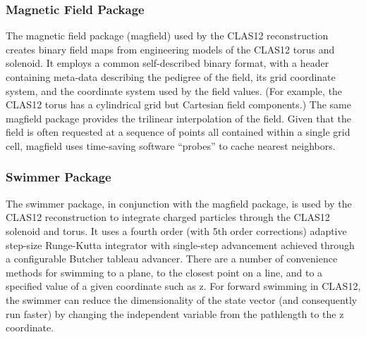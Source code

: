 \subsubsection{Magnetic Field Package}
The magnetic field package (magfield) used by the CLAS12 reconstruction creates
binary field maps from engineering models of the CLAS12 torus and solenoid. It employs
a common self-described binary format, with a header containing meta-data describing
the pedigree of the field, its grid coordinate system, and the coordinate system
used by the field values. (For example, the CLAS12 torus has a cylindrical grid
but Cartesian field components.) The same magfield package provides the trilinear
interpolation of the field. Given that the field is often requested at a sequence
of points all contained within a single grid cell, magfield uses time-saving
software “probes” to cache nearest neighbors.

\subsubsection{Swimmer Package}
The swimmer package, in conjunction with the magfield package, is used by the CLAS12
reconstruction to integrate charged particles through the CLAS12 solenoid and torus.
It uses a fourth order (with 5th order corrections) adaptive step-size Runge-Kutta integrator
with single-step advancement achieved through a configurable Butcher tableau advancer.
There are a number of convenience methods for swimming to a plane, to the closest
point on a line, and to a specified value of a given coordinate such as z. For
forward swimming in CLAS12, the swimmer can reduce the dimensionality of the state
vector (and consequently run faster) by changing the independent variable from
the pathlength to the z coordinate.


